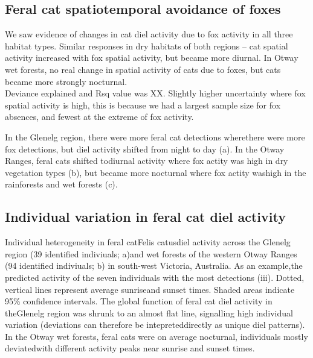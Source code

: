 \documentclass[]{elsarticle} %
\begin{document}
\hypertarget{feral-cat-spatiotemporal-avoidance-of-foxes-1}{%
\subsection{Feral cat spatiotemporal avoidance of foxes}\label{feral-cat-spatiotemporal-avoidance-of-foxes-1}}

We saw evidence of changes in cat diel activity due to fox activity in all three habitat types. Similar responses in dry habitats of both regions -- cat spatial activity increased with fox spatial activity, but became more diurnal.
In Otway wet forests, no real change in spatial activity of cats due to foxes, but cats became more strongly nocturnal.\\
Deviance explained and Rsq value was XX.
Slightly higher uncertainty where fox spatial activity is high, this is because we had a largest sample size for fox absences, and fewest at the extreme of fox activity.

In the Glenelg region, there were more feral cat detections wherethere were more fox detections, but diel activity shifted from night to day (a). In the Otway Ranges, feral cats shifted todiurnal activity where fox actity was high in dry vegetation types (b), but became more nocturnal where fox actity washigh in the rainforests and wet forests (c).

\hypertarget{individual-variation-in-feral-cat-diel-activity-1}{%
\subsection{Individual variation in feral cat diel activity}\label{individual-variation-in-feral-cat-diel-activity-1}}

Individual heterogeneity in feral catFelis catusdiel activity across the Glenelg region (39 identified indiviuals; a)and wet forests of the western Otway Ranges (94 identified indiviuals; b) in south-west Victoria, Australia. As an example,the predicted activity of the seven individuals with the most detections (iii). Dotted, vertical lines represent average sunriseand sunset times. Shaded areas indicate 95\% confidence intervals. The global function of feral cat diel activity in theGlenelg region was shrunk to an almost flat line, signalling high individual variation (deviations can therefore be intepreteddirectly as unique diel patterns). In the Otway wet forests, feral cats were on average nocturnal, individuals mostly deviatedwith different activity peaks near sunrise and sunset times.
\end{document}
